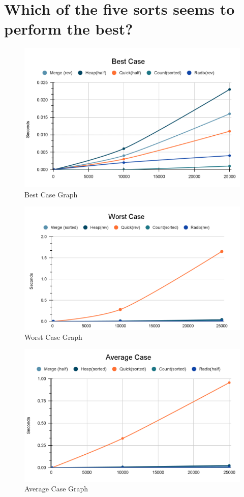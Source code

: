 \documentclass[12pt]{article}
\begin{document}
\section{Which of the five sorts seems to perform the best?}
\begin{figure}[h]
	\centering
	\includegraphics[width=\textwidth]{bestcase.PNG}
	\caption{Best Case Graph}
	\label{fig:mesh1}
\end{figure}
\begin{figure}[h]
	\centering
	\includegraphics[width=\textwidth]{worstcase.PNG}
	\caption{Worst Case Graph}
	\label{fig:mesh1}
\end{figure}
\begin{figure}[h]
	\centering
	\includegraphics[width=\textwidth]{averagecase.PNG}
	\caption{Average Case Graph}
	\label{fig:mesh1}
\end{figure}
\end{document}
